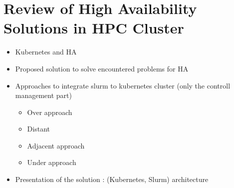 \documentclass{article}
\begin{document}
\section{Review of High Availability Solutions in HPC Cluster }
\begin{itemize}
    \item  Kubernetes and HA
    \item Proposed solution to solve encountered problems for HA
    \item Approaches to integrate slurm to kubernetes cluster (only the controll management part) 
           \begin{itemize}
            \item Over approach
            \item  Distant
            \item Adjacent approach 
            \item Under approach       
        \end{itemize}

    \item Presentation of the solution : (Kubernetes, Slurm) architecture 

\end{itemize}
\end{document}
